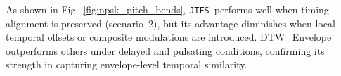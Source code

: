 \documentclass[runningheads]{llncs}
\newcommand{\JTFS}{\texttt{JTFS}\xspace}
\begin{document}
As shown in Fig.~\ref{fig:npsk_pitch_bends}, \JTFS\ performs well when timing alignment is preserved (scenario~2), but its advantage diminishes when local temporal offsets or composite modulations are introduced.  
DTW\_Envelope outperforms others under delayed and pulsating conditions, confirming its strength in capturing envelope-level temporal similarity.






\end{document}
